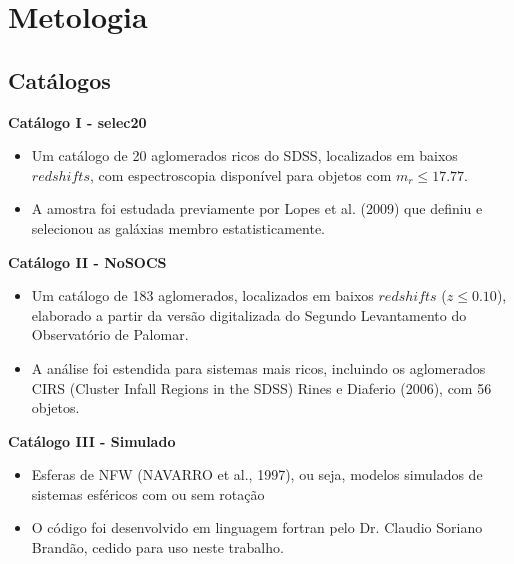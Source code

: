 \documentclass[xcolor=dvipsnames,10pt]{beamer}
\begin{document}
\section{Metologia}

\subsection{Catálogos}
\begin{frame}{\textbf{Catálogo I - selec20}}
  \begin{itemize}
    \item Um catálogo de 20 aglomerados ricos do SDSS, localizados em baixos $redshifts$, com espectroscopia disponível para objetos com $m_r \leq 17.77$.
    \item A amostra foi estudada previamente por Lopes et al. (2009) que definiu e selecionou as galáxias membro estatisticamente.
  \end{itemize}
\end{frame}

\begin{frame}{\textbf{Catálogo II - NoSOCS}}
  \begin{itemize}
    \item Um catálogo de 183 aglomerados, localizados em baixos $redshifts$ ($z \leq 0.10$), elaborado a partir da versão digitalizada do Segundo Levantamento do Observatório de Palomar.
    \item A análise foi estendida para sistemas mais ricos, incluindo os aglomerados CIRS (Cluster Infall Regions in the SDSS) Rines e Diaferio (2006), com 56 objetos.
  \end{itemize}
\end{frame}

\begin{frame}{\textbf{Catálogo III - Simulado}}
  \begin{itemize}
    \item Esferas de NFW (NAVARRO et al., 1997), ou seja, modelos simulados de sistemas esféricos com ou sem rotação
    \item O código foi desenvolvido em linguagem fortran pelo Dr. Claudio Soriano Brandão, cedido para uso neste trabalho.
  \end{itemize}
\end{frame}
\end{document}

